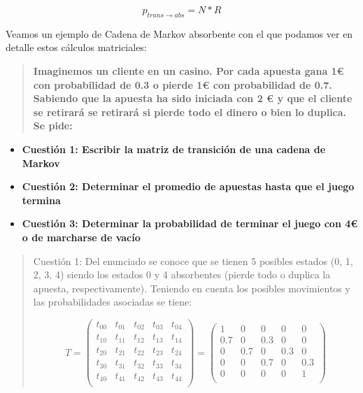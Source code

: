 \documentclass[
  a4paper,
  DIV=11,
  numbers=noendperiod]{scrreprt}
\providecommand{\tightlist}{%
  \setlength{\itemsep}{0pt}\setlength{\parskip}{0pt}}\usepackage{longtable,booktabs,array}
\begin{document}
\[
p_{trans \rightarrow abs}= N * R
\]

Veamos un ejemplo de Cadena de Markov absorbente con el que podamos ver
en detalle estos cálculos matriciales:

\begin{quote}
\textbf{Imaginemos un cliente en un casino. Por cada apuesta gana 1€ con
probabilidad de 0.3 o pierde 1€ con probabilidad de 0.7. Sabiendo que la
apuesta ha sido iniciada con 2 € y que el cliente se retirará se
retirará si pierde todo el dinero o bien lo duplica. Se pide:}
\end{quote}

\begin{itemize}
\tightlist
\item
  \textbf{Cuestión 1: Escribir la matriz de transición de una cadena de
  Markov}
\item
  \textbf{Cuestión 2: Determinar el promedio de apuestas hasta que el
  juego termina}
\item
  \textbf{Cuestión 3: Determinar la probabilidad de terminar el juego
  con 4€ o de marcharse de vacío}
\end{itemize}

\begin{quote}
Cuestión 1: Del enunciado se conoce que se tienen 5 posibles estados (0,
1, 2, 3, 4) siendo los estados 0 y 4 absorbentes (pierde todo o duplica
la apuesta, respectivamente). Teniendo en cuenta los posibles
movimientos y las probabilidades asociadas se tiene:

\[
T = \begin{pmatrix}
t_{00} & t_{01} & t_{02} & t_{03} & t_{04} \\
t_{10} & t_{11} & t_{12} & t_{13} & t_{14} \\
t_{20} & t_{21} & t_{22} & t_{23} & t_{24} \\
t_{30} & t_{31} & t_{32} & t_{33} & t_{34} \\
t_{40} & t_{41} & t_{42} & t_{43} & t_{44} \\
\end{pmatrix} = \begin{pmatrix}
1 & 0 & 0 & 0 & 0 \\
0.7 & 0 & 0.3 & 0 & 0 \\
0 & 0.7 & 0 & 0.3 & 0 \\
0 & 0 & 0.7 & 0 & 0.3 \\
0 & 0 & 0 & 0 & 1 \\
\end{pmatrix}
\]
\end{quote}
\end{document}
